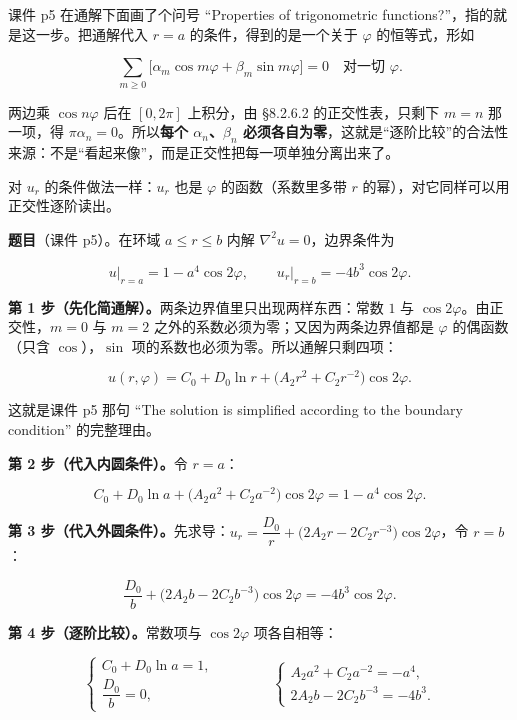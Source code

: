 
课件 p5 在通解下面画了个问号 “Properties of trigonometric functions?”，指的就是这一步。把通解代入 $r=a$ 的条件，得到的是一个关于 $\varphi$ 的恒等式，形如

\[
\sum_{m\ge0}\big[\alpha_m\cos m\varphi+\beta_m\sin m\varphi\big]=0\quad\text{对一切 }\varphi .
\]

两边乘 $\cos n\varphi$ 后在 $[0,2\pi]$ 上积分，由 \S8.2.6.2 的正交性表，只剩下 $m=n$ 那一项，得 $\pi\alpha_n=0$。所以\textbf{每个 $\alpha_n$、$\beta_n$ 必须各自为零}，这就是“逐阶比较”的合法性来源：不是“看起来像”，而是正交性把每一项单独分离出来了。

对 $u_r$ 的条件做法一样：$u_r$ 也是 $\varphi$ 的函数（系数里多带 $r$ 的幂），对它同样可以用正交性逐阶读出。


\textbf{题目}（课件 p5）。在环域 $a\le r\le b$ 内解 $\nabla^2u=0$，边界条件为

\[
u\big|_{r=a}=1-a^4\cos2\varphi,\qquad
u_r\big|_{r=b}=-4b^3\cos2\varphi .
\]

\textbf{第 1 步（先化简通解）。}两条边界值里只出现两样东西：常数 $1$ 与 $\cos2\varphi$。由正交性，$m=0$ 与 $m=2$ 之外的系数必须为零；又因为两条边界值都是 $\varphi$ 的偶函数（只含 $\cos$），$\sin$ 项的系数也必须为零。所以通解只剩四项：

\begin{equation}
u(r,\varphi)=C_0+D_0\ln r+\big(A_2r^2+C_2r^{-2}\big)\cos2\varphi .
\label{eq:annform}
\end{equation}

这就是课件 p5 那句 “The solution is simplified according to the boundary condition” 的完整理由。

\textbf{第 2 步（代入内圆条件）。}令 $r=a$：

\[
C_0+D_0\ln a+\big(A_2a^2+C_2a^{-2}\big)\cos2\varphi=1-a^4\cos2\varphi .
\]

\textbf{第 3 步（代入外圆条件）。}先求导：$u_r=\dfrac{D_0}{r}+\big(2A_2r-2C_2r^{-3}\big)\cos2\varphi$，令 $r=b$：

\[
\frac{D_0}{b}+\big(2A_2b-2C_2b^{-3}\big)\cos2\varphi=-4b^3\cos2\varphi .
\]

\textbf{第 4 步（逐阶比较）。}常数项与 $\cos2\varphi$ 项各自相等：

\begin{equation}
\begin{cases}
C_0+D_0\ln a=1,\\[2pt]
\dfrac{D_0}{b}=0,
\end{cases}
\qquad\qquad
\begin{cases}
A_2a^2+C_2a^{-2}=-a^4,\\[2pt]
2A_2b-2C_2b^{-3}=-4b^3 .
\end{cases}
\label{eq:annsys}
\end{equation}

